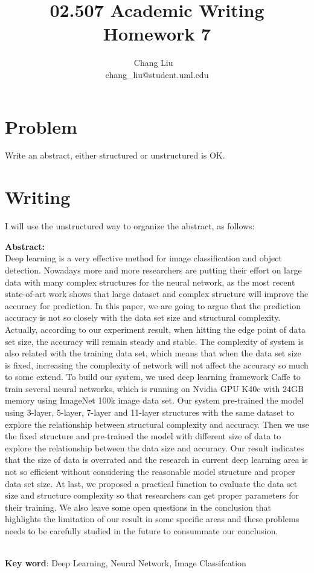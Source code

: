 \documentclass{article}
\title{02.507 Academic Writing Homework 7}
\author{Chang Liu ~\\ chang\_liu@student.uml.edu}
\begin{document}
\maketitle

\section{Problem}

Write an abstract, either structured or unstructured is OK.

\section{Writing}

I will use the unstructured way to organize the abstract, as follows: ~\\

\large{

\noindent \textbf{Abstract:} ~\\

Deep learning is a very effective method for image classification and object detection. Nowadays more and more researchers are putting their effort on large data with many complex structures for the neural network, as the most recent state-of-art work shows that large dataset and complex structure will improve the accuracy for prediction. In this paper, we are going to argue that the prediction accuracy is not so closely with the data set size and structural complexity. Actually, according to our experiment result, when hitting the edge point of data set size, the accuracy will remain steady and stable. The complexity of system is also related with the training data set, which means that when the data set size is fixed, increasing the complexity of network will not affect the accuracy so much to some extend. To build our system, we used deep learning framework Caffe to train several neural networks, which is running on Nvidia GPU K40c with 24GB memory using ImageNet 100k image data set. Our system pre-trained the model using 3-layer, 5-layer, 7-layer and 11-layer structures with the same dataset to explore the relationship between structural complexity and accuracy. Then we use the fixed structure and pre-trained the model with different size of data to explore the relationship between the data size and accuracy. Our result indicates that the size of data is overrated and the research in current deep learning area is not so efficient without considering the reasonable model structure and proper data set size. At last, we proposed a practical function to evaluate the data set size and structure complexity so that researchers can get proper parameters for their training. We also leave some open questions in the conclusion that highlights the limitation of our result in some specific areas and these problems needs to be carefully studied in the future to consummate our conclusion.

~\\
\textbf{Key word}: Deep Learning, Neural Network, Image Classifcation



}
\end{document}
